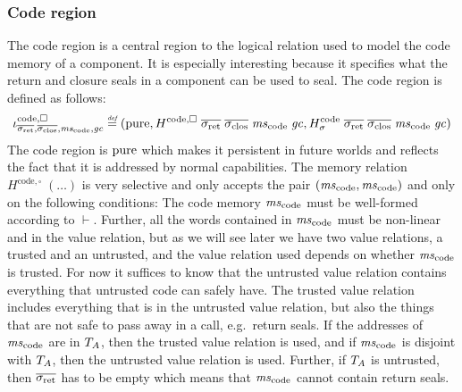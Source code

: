 \documentclass[acmsmall,review,anonymous]{acmart}\settopmatter{printfolios=true,printccs=false,printacmref=false}
\begin{document}
\subsubsection{Code region}
The code region is a central region to the logical relation used to model the code memory of a component.
It is especially interesting because it specifies what the return and closure seals in a component can be used to seal.
The code region is defined as follows:
\[
  \codereg{\sigrets,\sigcloss,\mscode,\gc} \defeq (\pure,
  H^\mathrm{code,\square} \; \sigrets \; \sigcloss \; \mscode \; \gc,
  H^\mathrm{code}_\sigma \; \sigrets \; \sigcloss \; \mscode \; \gc)
\]
The code region is $\mathrm{pure}$ which makes it persistent in future worlds and reflects the fact that it is addressed by normal capabilities.
The memory relation $H^\mathrm{code,\square} \; (\dots)$ is very selective and only accepts the pair $(\mscode,\mscode)$ and only on the following conditions: The code memory $\mscode$ must be well-formed according to $\vdash$.
Further, all the words contained in $\mscode$ must be non-linear and in the value relation, but as we will see later we have two value relations, a trusted and an untrusted, and the value relation used depends on whether $\mscode$ is trusted.
For now it suffices to know that the untrusted value relation contains everything that untrusted code can safely have.
The trusted value relation includes everything that is in the untrusted value relation, but also the things that are not safe to pass away in a call, e.g.\ return seals.
If the addresses of $\mscode$ are in $T_{A}$, then the trusted value relation is used, and if $\mscode$ is disjoint with $T_{A}$, then the untrusted value relation is used.
Further, if $T_{A}$ is untrusted, then $\sigrets$ has to be empty which means that $\mscode$ cannot contain return seals.

\end{document}

